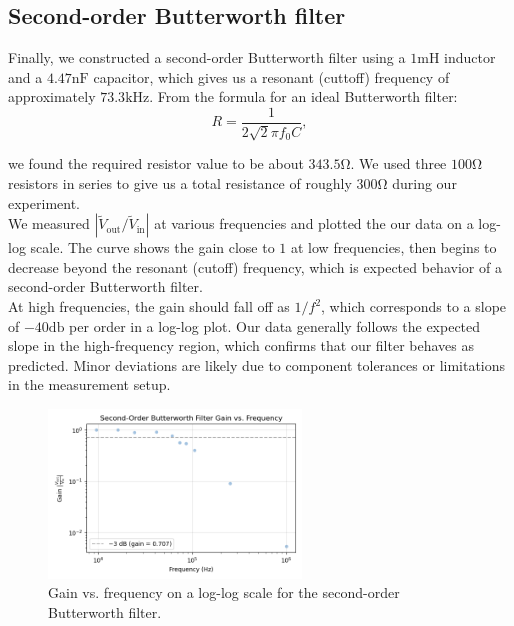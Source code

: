 \documentclass{article}
\begin{document}
\subsection{Second-order Butterworth filter}

Finally, we constructed a second-order Butterworth filter using a $1\si{\milli\henry}$
inductor and a $4.47\si{\nano\farad}$ capacitor, which gives us a resonant
(cuttoff) frequency of approximately $73.3\si{\kilo\hertz}$. From the formula
for an ideal Butterworth filter:
\begin{equation}
    R=\frac{1}{2\sqrt{2}\pi f_0 C},
\end{equation}

\noindent we found the required resistor value to be about $343.5\si{\ohm}$. We used three $100\si{\ohm}$
resistors in series to give us a total resistance of roughly $300\si{\ohm}$ during our experiment.\\

\noindent We measured $|\widetilde{V}_\text{out} / \widetilde{V}_\text{in}|$ at various frequencies
and plotted the our data on a log-log scale. The curve shows the gain close to $1$
at low frequencies, then begins to decrease beyond the resonant (cutoff) frequency,
which is expected behavior of a second-order Butterworth filter.\\

\noindent At high frequencies, the gain should fall off as $1/f^2$, which corresponds to
a slope of $-40\si{\decibel}$ per order in a log-log plot. Our data generally follows
the expected slope in the high-frequency region, which confirms that our filter
behaves as predicted. Minor deviations are likely due to component tolerances
or limitations in the measurement setup.

\begin{figure}[H]
    \centering
    \includegraphics[width=0.6\textwidth]{3.da.png}
    \caption{Gain vs. frequency on a log-log scale for the second-order Butterworth filter.}
    \label{fig:butterworth_gain}
\end{figure}
\end{document}
